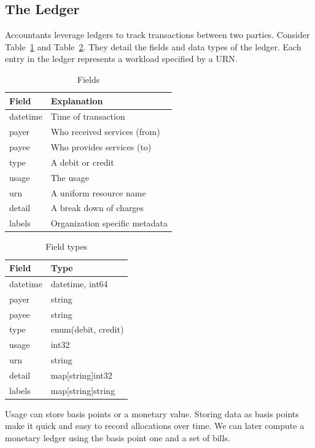 \documentclass[10pt, a4paper, twocolumn]{article}
\begin{document}
  \subsection*{The Ledger}
    Accountants leverage ledgers to track transactions between two parties.
    Consider Table~\ref{table:2} and Table~\ref{table:3}.
    They detail the fields and data types of the ledger.
    Each entry in the ledger represents a workload specified by a URN.

    \begin{table}[H]
      \centering
      \begin{tabular}{ l|l }
        Field & Explanation \\
        \hline
        datetime & Time of transaction \\
        payer & Who received services (from) \\
        payee & Who provides services (to) \\
        type & A debit or credit \\
        usage & The usage \\
        urn & A uniform resource name \\
        detail & A break down of charges \\
        labels & Organization specific metadata \\
      \end{tabular}
      \caption{Fields}
      \label{table:2}
    \end{table}

    \begin{table}[H]
      \centering
      \begin{tabular}{ l|l }
        Field & Type \\
        \hline
        datetime & datetime, int64 \\
        payer & string \\
        payee & string \\
        type & enum(debit, credit) \\
        usage & int32 \\
        urn & string \\
        detail & map[string]int32 \\
        labels & map[string]string \\
      \end{tabular}
      \caption{Field types}
      \label{table:3}
    \end{table}

    Usage can store basis points or a monetary value.
    Storing data as basis points make it quick and easy to record allocations over time.
    We can later compute a monetary ledger using the basis point one and a set of bills.
\end{document}
